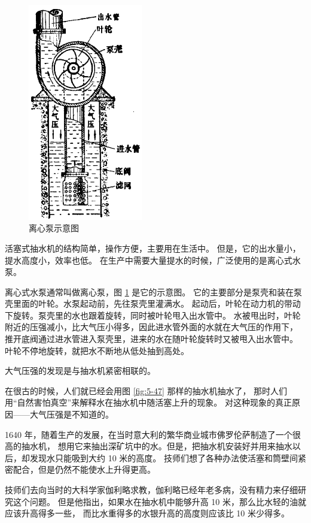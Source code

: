 \begin{figure}
    \centering
    \includegraphics[width=5cm]{../pic/czwl1-ch5-48}
    \caption{离心泵示意图}\label{fig:5-48}
\end{figure}
活塞式抽水机的结构简单，操作方便，主要用在生活中。
但是，它的出水量小，提水高度小，效率也低。
在生产中需要大量提水的时候，广泛使用的是离心式水泵。

离心式水泵通常叫做离心泵，图 \ref{fig:5-48} 是它的示意图。
它的主要部分是泵壳和装在泵壳里面的叶轮。水泵起动前，先往泵壳里灌满水。
起动后，叶轮在动力机的带动下旋转。泵壳里的水也跟着旋转，同时被叶轮甩入出水管中。
水被甩出时，叶轮附近的压强减小，比大气压小得多，因此进水管外面的水就在大气压的作用下，
推开底阀通过进水管进入泵壳里，进来的水在随叶轮旋转时又被甩入出水管中。
叶轮不停地旋转，就把水不断地从低处抽到高处。



大气压强的发现是与抽水机紧密相联的。

在很古的时候，人们就已经会用图 \ref{fig:5-47} 那样的抽水机抽水了，
那时人们用“自然害怕真空”来解释水在抽水机中随活塞上升的现象。
对这种现象的真正原因——大气压强是不知道的。

1640 年，随着生产的发展，在当时意大利的繁华商业城市佛罗伦萨制造了一个很高的抽水机，
想用它来抽出深矿坑中的水。但是，把抽水机安装好并用来抽水以后，却发现水只能吸到大约 10 米的高度。
技师们想了各种办法使活塞和筒壁间紧密配合，但是仍然不能使水上升得更高。

技师们去向当时的大科学家伽利略求教，伽利略已经年老多病，没有精力来仔细研究这个问题。
但是他指出，如果水在抽水机中能够升高 10 米，那么比水轻的油就应该升高得多一些，
而比水重得多的水银升高的高度则应该比 10 米少得多。

